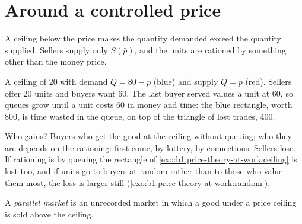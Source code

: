 \section{Around a controlled price}\label{sec:b1:price-theory-at-work:controls}

A ceiling below the  price makes the quantity demanded exceed the
quantity supplied. Sellers supply only $S(\bar p)$, and the units are rationed
by something other than the money price.

\begin{omfigure}

{\small A ceiling of 20 with demand $Q = 80 - p$ (blue) and supply $Q = p$ (red).
Sellers offer 20 units and buyers want 60. The last buyer served values a
unit at 60, so queues grow until a unit costs 60 in money and time: the
blue rectangle, worth 800, is time wasted in the queue, on top of the
triangle of lost trades, 400.}
\end{omfigure}

Who gains? Buyers who get the good at the ceiling without queuing; who
they are depends on the rationing: first come, by lottery, by connections.
Sellers lose. If rationing is by queuing the rectangle of
\cref{exo:b1:price-theory-at-work:ceiling} is lost too, and if units go to
buyers at random rather than to those who value them most, the loss is
larger still (\cref{exo:b1:price-theory-at-work:random}).

\begin{definition}\label{def:b1:price-theory-at-work:parallel-market}
A \emph{parallel market} is an unrecorded market in which a good under a
price ceiling is sold above the ceiling.
\end{definition}

